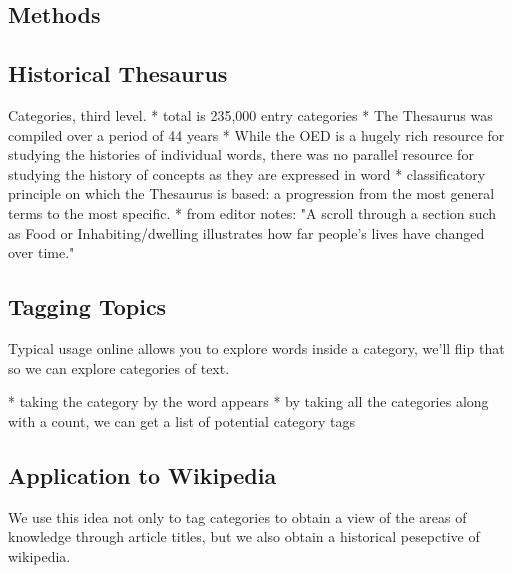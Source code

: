 \documentclass[a4paper, 12pt]{article}
\title{}
\date{}
\begin{document}
\begin{center}
\section*{Methods}
\end{center}

\subsection*{Historical Thesaurus}

Categories, third level.
    * total is 235,000 entry categories
* The Thesaurus was compiled over a period of 44 years
* While the OED is a hugely rich resource for studying the histories of individual words, there was no parallel resource for studying the history of concepts as they are expressed in word
* classificatory principle on which the Thesaurus is based: a progression from the most general terms to the most specific.
* from editor notes: "A scroll through a section such as Food or Inhabiting/dwelling illustrates how far people’s lives have changed over time."


\subsection*{Tagging Topics}

Typical usage online allows you to explore words inside a category, we'll flip that so we can explore categories of text.

* taking the category by the word appears
* by taking all the categories along with a count, we can get a list of potential category tags


\subsection*{Application to Wikipedia}

We use this idea not only to tag categories to obtain a view of the areas of knowledge through article titles, 
but we also obtain a historical pesepctive of wikipedia.
\end{document}
